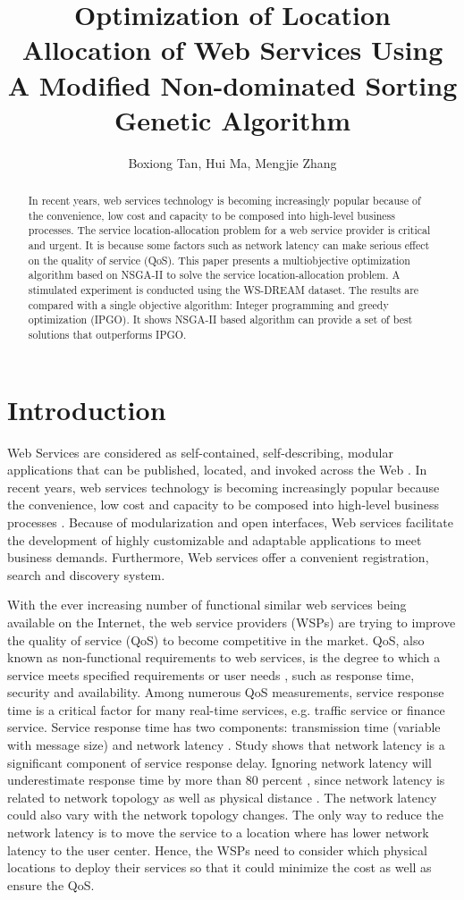 \documentclass{llncs}
\title{
Optimization of Location Allocation of Web Services Using A Modified Non-dominated Sorting Genetic Algorithm
}
\author{Boxiong Tan, Hui Ma, Mengjie Zhang}
\institute{School of Engineering and Computer Science,
\\Victoria University of Wellington, New Zealand \\
\email{\{Boxiong.Tan, Hui.Ma, Mengjie.Zhang\}@ecs.vuw.ac.nz}}
\begin{document}
\maketitle

\begin{abstract}
In recent years, web services technology is becoming increasingly popular because of the convenience, 
low cost and capacity to be composed into high-level business processes. 
The service location-allocation problem for a web service provider is critical and urgent. 
It is because some factors such as network latency can make serious effect on the quality of service (QoS). 
This paper presents a multiobjective optimization algorithm based on NSGA-II to solve the service location-allocation problem. 
A stimulated experiment is conducted using the WS-DREAM dataset. 
The results are compared with a single objective algorithm: Integer programming and greedy optimization (IPGO). 
It shows NSGA-II based algorithm can provide a set of best solutions that outperforms IPGO.
\end{abstract}

\section{Introduction}
Web Services are considered as self-contained, self-describing, modular applications that can be published, located, and invoked across the Web \cite{Ran}. 
In recent years, web services technology is becoming increasingly popular because the convenience, low cost and capacity to be composed into high-level business processes \cite{Aboolian}.
Because of modularization and open interfaces, Web services facilitate the development of highly 
customizable and adaptable applications to meet business demands. Furthermore, Web services offer a 
convenient registration, search  and discovery system.

With the ever increasing number of functional similar web services being available on the Internet, the web service providers (WSPs) are trying to improve the quality of service (QoS) to become competitive in the market.  
QoS, also known as non-functional requirements to  web services, is the degree to which a service meets specified requirements or user needs \cite{4061431}, such as response time, security and availability. 
Among numerous QoS measurements, service response time is a critical factor for many real-time services, e.g. traffic service or finance service. 
Service response time has two components: transmission time (variable with message size) and network latency \cite{Johansson}. 
Study \cite{916684} shows that network latency is a significant component of service response delay.
Ignoring network latency will underestimate response time by more than 80 percent \cite{Sun}, since network latency is related to network topology as well as physical distance \cite{distanceMetrics}. 
The network latency could also vary with the network topology changes.
The only way to reduce the network latency is to move the service to a location where has lower network latency to the user center. 
Hence, the WSPs need to consider which physical locations to deploy their services so that it could minimize the cost as well as ensure the QoS.
\end{document}

